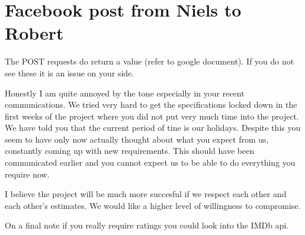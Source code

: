 \section{Facebook post from Niels to Robert}
\label{app:enough}
The POST requests do return a value (refer to google document). If you do not
see these it is an issue on your side.

Honestly I am quite annoyed by the tone especially in your recent
communications. We tried very hard to get the specifications locked down in the
first weeks of the project where you did not put very much time into the
project. We have told you that the current period of tine is our holidays.
Despite this you seem to have only now actually thought about what you expect
from us, constantly coming up with new requirements. This should have been
communicated earlier and you cannot expect us to be able to do everything you
require now.

I believe the project will be much more succesful if we respect each other and
each other's estimates. We would like a higher level of willingness to
compromise.

On a final note if you really require ratings you could look into the IMDb api.
